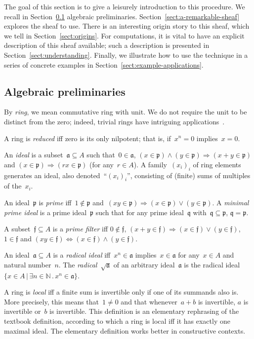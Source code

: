 \documentclass{ws-rv9x6}
\newcommand{\NN}{\mathbb{N}}
\newcommand{\aaa}{\mathfrak{a}}
\newcommand{\ppp}{\mathfrak{p}}
\newcommand{\qqq}{\mathfrak{q}}
\newcommand{\fff}{\mathfrak{f}}
\renewcommand{\_}{\mathpunct{.}}
\newcommand{\?}{\,{:}\,}
\begin{document}
The goal of this section is to give a leisurely introduction to this procedure.
We recall in Section~\ref{sect:algebraic-preliminaries} algebraic
preliminaries. Section~\ref{sect:a-remarkable-sheaf} explores the sheaf to use.
There is an interesting origin story to this sheaf, which we tell in
Section~\ref{sect:origins}. For computations, it is vital to have an explicit
description of this sheaf available; such a description is presented in
Section~\ref{sect:understanding}. Finally, we illustrate how to use the technique in
a series of concrete examples in Section~\ref{sect:example-applications}.


\subsection{Algebraic preliminaries}
\label{sect:algebraic-preliminaries}

By \emph{ring}, we mean commutative ring with unit. We do not require the unit
to be distinct from the zero; indeed, trivial rings have intriguing
applications~\cite{richman:trivial-rings}.

A ring is \emph{reduced} iff zero is its only nilpotent; that is, if~$x^n = 0$
implies~$x = 0$.

An \emph{ideal} is a subset~$\aaa \subseteq A$ such that~$0 \in \aaa$, $(x \in
\ppp) \wedge (y \in \ppp) \Rightarrow (x + y \in \ppp)$ and $(x \in
\ppp) \Rightarrow (rx \in \ppp)$ (for any~$r \in A$). A family~$(x_i)_i$ of
ring elements generates an ideal, also denoted~``$(x_i)_i$'', consisting of
(finite) sums of multiples of the~$x_i$.

An ideal~$\ppp$ is \emph{prime} iff~$1 \not\in \ppp$ and~$(xy
\in \ppp) \Rightarrow (x \in \ppp) \vee (y \in \ppp)$.
A \emph{minimal prime ideal} is a prime ideal~$\ppp$ such that for any prime
ideal~$\qqq$ with~$\qqq \subseteq \ppp$, $\qqq = \ppp$.

A subset~$\fff \subseteq A$ is a \emph{prime filter} iff
$0 \not\in \fff$, $(x + y \in \fff) \Rightarrow (x \in \fff) \vee (y \in
\fff)$, $1 \in \fff$ and $(xy \in \fff) \Leftrightarrow (x \in \fff) \wedge (y
\in \fff)$.

An ideal~$\aaa \subseteq A$ is a \emph{radical ideal} iff~$x^n \in \aaa$
implies~$x \in \aaa$ for any~$x \in A$ and natural number~$n$. The
\emph{radical}~$\sqrt{\aaa}$ of an arbitrary ideal~$\aaa$ is the radical
ideal~$\{ x \in A \,|\, \exists n \in \NN\_ x^n \in \aaa \}$.

A ring is \emph{local} iff a finite sum is invertible only if one of its
summands also is. More precisely, this means that~$1 \neq 0$ and that
whenever~$a + b$ is invertible, $a$ is invertible or~$b$ is invertible.
This definition is an elementary rephrasing of the textbook definition,
according to which a ring is local iff it has exactly one maximal ideal. The
elementary definition works better in constructive contexts.
\end{document}
